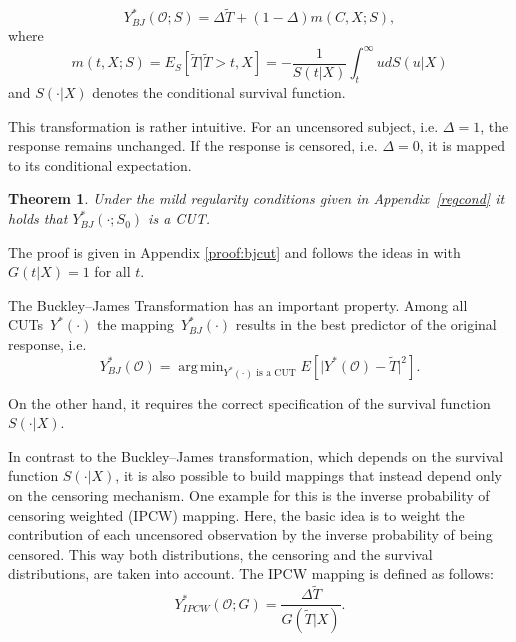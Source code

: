 \documentclass[12pt, a4paper]{scrartcl}
\theoremstyle{definition}
\theoremstyle{plain}
\newtheorem{Theorem}{Theorem}[section]
\numberwithin{equation}{section}
\numberwithin{figure}{section}
\numberwithin{table}{section}
\DeclareMathOperator*{\argmin}{arg\,min}
\begin{document}
	\begin{equation}\label{eq:bjtrafo}
		Y_{BJ}^* (\mathcal{O}; S) = \Delta \tilde{T} + (1-\Delta)m(C,X;S),
	\end{equation}
	where
	\begin{equation}\label{eq:condmean}
		m(t,X;S) = E_S[\tilde{T} \vert \tilde T > t, X] = -\frac{1}{S(t\vert X)} \int_t^{\infty} u dS(u\vert X)
	\end{equation}%
	and $S(\cdot\vert X)$ denotes the conditional survival function.
	
	
	This transformation is rather intuitive.
	For an uncensored subject, i.e. $\Delta = 1$, the response remains unchanged.
	If the response is censored, i.e. $\Delta = 0$, it is mapped to its conditional expectation. %
	
	\begin{Theorem}\label{thm:bj}
		Under the mild regularity conditions given in Appendix~\ref{regcond} it holds that $Y_{BJ}^*(\cdot; S_0)$ is a CUT.
	\end{Theorem}
	
	The proof is given in Appendix \ref{proof:bjcut} and follows the ideas in \citet*{drcut} with $G(t\vert X)=1$ for all $t$.
	
	The Buckley--James Transformation has an important property.
	Among all CUTs~$Y^*(\cdot)$ the mapping~$Y_{BJ}^* (\cdot)$ results in the best predictor of the original response, i.e.
	\begin{equation*}
	Y_{BJ}^* (\mathcal{O})= \argmin_{\text{$Y^*(\cdot)$~is~a~CUT}} E[ \vert Y^*(\mathcal{O}) - \tilde T \vert ^2].
	\end{equation*}
	
	On the other hand, it requires the correct specification of the survival function~$S(\cdot\vert X)$.

	In contrast to the Buckley--James transformation, which depends on the survival function $S(\cdot\vert X)$, it is also possible to build mappings that instead depend only on the censoring mechanism.
	One example for this is the inverse probability of censoring weighted (IPCW) mapping.
	Here, the basic idea is to weight the contribution of each uncensored observation by the inverse probability of being censored.
	This way both distributions, the censoring and the survival distributions, are taken into account.
	The IPCW mapping is defined as follows:
	\begin{equation*}
	Y_{IPCW}^*(\mathcal{O}; G) = \frac{\Delta \tilde T}{G(\tilde T \vert X)}.
	\end{equation*}
\end{document}
